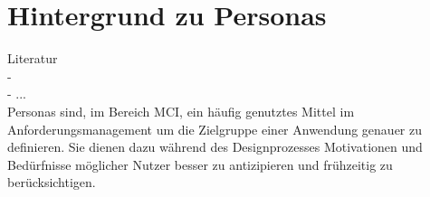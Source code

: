\section{Hintergrund zu Personas}

Literatur\\
- \href{https://www.researchgate.net/publication/215500610_Personas_From_Theory_to_Practices}\\
- ...\\

Personas sind, im Bereich \ac{MCI}, ein häufig genutztes Mittel im Anforderungsmanagement um die Zielgruppe einer Anwendung genauer zu definieren. Sie dienen dazu während des Designprozesses Motivationen und Bedürfnisse möglicher Nutzer besser zu antizipieren und frühzeitig zu berücksichtigen.

